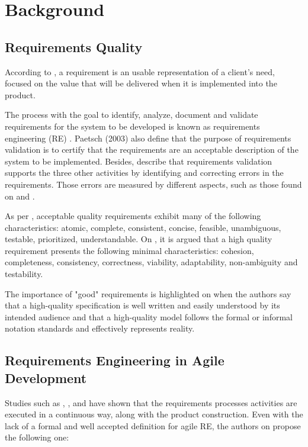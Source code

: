 \section{Background}

\subsection{Requirements Quality}

According to \cite{Babok_2015}, a requirement is an usable representation of a client's need, focused on the value that will be delivered when it is implemented into the product. 

The process with the goal to identify, analyze, document and validate requirements for the system to be developed is known as requirements engineering (RE) \cite{Paetsch_2003}. Paetsch (2003) also define that the purpose of requirements validation is to certify that the requirements are an acceptable description of the system to be implemented. Besides, \cite{Heikkil_2015} describe that requirements validation supports the three other activities by identifying and correcting errors in the requirements. Those errors are measured by different aspects, such as those found on \cite{Babok_2009} and \cite{Babok_2015}. 

As per \cite{Babok_2015}, acceptable quality requirements exhibit many of the following characteristics: atomic, complete, consistent, concise, feasible, unambiguous, testable, prioritized, understandable. On \cite{Babok_2009}, it is argued that a high quality requirement presents the following minimal characteristics: cohesion, completeness, consistency, correctness, viability, adaptability, non-ambiguity and testability. 

The importance of "good" requirements is highlighted on \cite{Babok_2015} when the authors say that a high-quality specification is well written and easily understood by its intended audience and that a high-quality model follows the formal or informal notation standards and effectively represents reality. 

\subsection{Requirements Engineering in Agile Development}

Studies such as \cite{Medeiros_2015}, \cite{Paetsch_2003}, \cite{Heikkil_2015} and \cite{Inayat_2015} have shown that the requirements processes activities are executed in a continuous way, along with the product construction. Even with the lack of a formal and well accepted definition for agile RE, the authors on \cite{Heikkil_2015} propose the following one:

